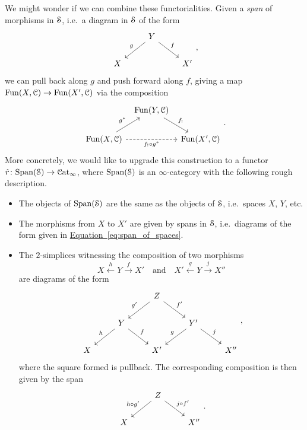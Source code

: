 \documentclass[main.tex]{subfiles}
\begin{document}
We might wonder if we can combine these functorialities. Given a \emph{span} of morphisms in $\S$, i.e.\ a diagram in $\S$ of the form
\begin{equation}
  \label{eq:span_of_spaces}
  \begin{tikzcd}
    & Y
    \arrow[dl, swap, "g"]
    \arrow[dr, "f"]
    \\
    X
    && X'
  \end{tikzcd},
\end{equation}
we can pull back along $g$ and push forward along $f$, giving a map $\Fun(X, \category{C}) \to \Fun(X', \category{C})$ via the composition
\begin{equation*}
  \begin{tikzcd}[column sep=tiny]
    & \Fun(Y, \category{C})
    \arrow[dr, "f_{!}"]
    \\
    \Fun(X, \category{C})
    \arrow[rr, dashed, swap, "f_{!} \circ g^{*}"]
    \arrow[ur, "g^{*}"]
    && \Fun(X', \category{C})
  \end{tikzcd}.
\end{equation*}
More concretely, we would like to upgrade this construction to a functor $\hat{r}\colon \Span(\S) \to \ICat$, where $\Span(\S)$ is an $\infty$-category with the following rough description.
\begin{itemize}
  \item The objects of $\Span(\S)$ are the same as the objects of $\S$, i.e.\ spaces $X$, $Y$, etc.

  \item The morphisms from $X$ to $X'$ are given by spans in $\S$, i.e.\ diagrams of the form given in \hyperref[eq:span_of_spaces]{Equation~\ref*{eq:span_of_spaces}}.

  \item The $2$-simplices witnessing the composition of two morphisms 
    \begin{equation*}
      X \overset{h}{\leftarrow} Y \overset{f}{\rightarrow} X' \quad\text{and}\quad X' \overset{g}{\leftarrow} Y \overset{j}{\rightarrow} X''
    \end{equation*}
    are diagrams of the form
    \begin{equation}
      \label{eq:diagram_witnessing_composition}
      \begin{tikzcd}
        && Z
        \arrow[dl, swap, "g'"]
        \arrow[dr, "f'"]
        \\
        & Y
        \arrow[dl, swap, "h"]
        \arrow[dr, "f"]
        && Y'
        \arrow[dl, swap, "g"]
        \arrow[dr, "j"]
        \\
        X
        && X'
        && X''
      \end{tikzcd},
    \end{equation}
    where the square formed is pullback. The corresponding composition is then given by the span
    \begin{equation*}
      \begin{tikzcd}
        & Z
        \arrow[dl, swap, "h \circ g'"]
        \arrow[dr, "j \circ f'"]
        \\
        X
        && X''
      \end{tikzcd}.
    \end{equation*}
\end{itemize}
\end{document}

